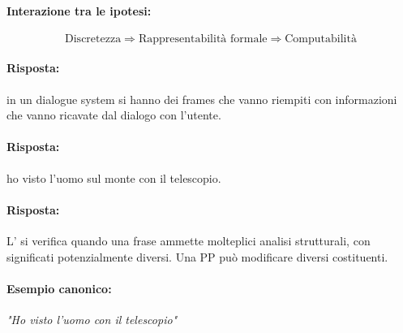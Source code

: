 \paragraph{Interazione tra le ipotesi:}
\[
\text{Discretezza} \Rightarrow \text{Rappresentabilità formale} \Rightarrow \text{Computabilità}
\]


\paragraph{Risposta:} in un dialogue system si hanno dei frames che vanno riempiti con informazioni che vanno ricavate dal dialogo con l'utente. 



\paragraph{Risposta:} ho visto l'uomo sul monte con il telescopio.


\paragraph{Risposta:} L' si verifica quando una frase ammette molteplici analisi strutturali, con significati potenzialmente diversi. Una PP può modificare diversi costituenti.

\paragraph{Esempio canonico:}
\textit{"Ho visto l'uomo con il telescopio"}

